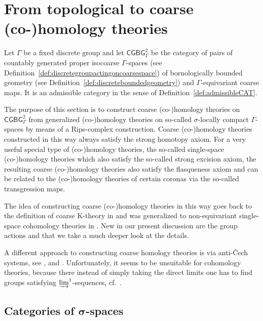 \documentclass[pdftex]{sigma}
\numberwithin{equation}{section}
\theoremstyle{definition}
\newcommand{\categoryfont}[1]{\mathsf{#1}}
\newcommand{\CGCBGz}[1][\Gamma]{\categoryfont{CGBG}^2_{#1}}
\newcommand{\K}{\mathrm{K}}
\begin{document}
\section{From topological to coarse (co-)homology theories}\label{sec:Sigmastuff}

Let $\Gamma$ be a fixed discrete group and let $\CGCBGz$ be the category of pairs of countably gene\-ra\-ted proper isocoarse $\Gamma$-spaces (see Definition~\ref{def:discretegroupactingoncoarsespace}) of bornologically bounded geometry (see Definition~\ref{def:discreteboundedgeometry}) and $\Gamma$-equivariant coarse maps. It is an admissible category in the sense of Definition~\ref{def:admissibleCAT}.

The purpose of this section is to construct coarse \mbox{(co-)}homology theories on $\CGCBGz$ from generalized \mbox{(co-)}homology theories on so-called $\sigma$-locally compact $\Gamma$-spaces by means of a Rips-complex construction. Coarse \mbox{(co-)}homology theories constructed in this way always satisfy the strong homotopy axiom.
For a very useful special type of \mbox{(co-)}homology theories, the so-called single-space \mbox{(co-)}homology theories which also satisfy the so-called strong excision axiom, the resulting coarse \mbox{(co-)}homology theories also satisfy the flasqueness axiom and can be related to the \mbox{(co-)}homology theories of certain coronas via the so-called transgression maps.

The idea of constructing coarse \mbox{(co-)}homology theories in this way goes back to the definition of coarse $\K$-theory in \cite{EmeMeyDualizing} and was generalized to non-equivariant single-space cohomology theories in \cite[Section 4]{EngelWulff}. New in our present discussion are the group actions and that we take a much deeper look at the details.

A different approach to constructing coarse homology theories is via anti-\v{C}ech systems, see \cite[Section~2]{HigsonRoeOberwolfach}, \cite[Definition~3.5]{MitchenerCoarse} and
\cite[Section 5.5]{RoeCoarseGeometry}. Unfortunately, it seems to be unsuitable for cohomology theories, because there instead of simply taking the direct limits one has to find groups satisfying $\varinjlim^1$-sequences, cf.\ \cite[Chapter~3]{RoeCoarseCohomIndexTheory}.

\subsection[Categories of sigma-spaces]{Categories of $\boldsymbol{\sigma}$-spaces}
\end{document}
